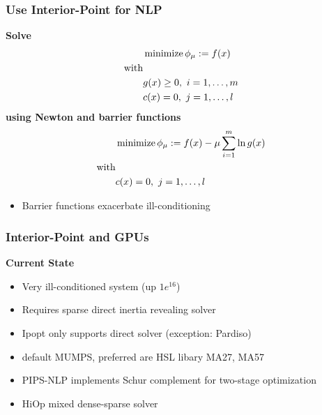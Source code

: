 \begin{frame}[fragile]
  \frametitle{Use Interior-Point for NLP}
  {\bf Solve}
  \begin{align*}
  &\minimize \phi_\mu := f(x)\\ 
  \text{with}&\\
  &g(x) \geq 0, \ i=1,\dots, m \\
  &c(x) = 0, \ j=1,\dots, l \\
  \end{align*}
  {\bf using Newton and barrier functions}
  \begin{align*}
  &\minimize \phi_\mu := f(x) - \mu \sum^m_{i=1} \ln g(x)\\ 
  \text{with}&\\
  &c(x) = 0, \ j=1,\dots, l 
  \end{align*}
  \begin{itemize}
    \item Barrier functions exacerbate ill-conditioning
  \end{itemize}
\end{frame}

\begin{frame}[fragile]
  \frametitle{Interior-Point and GPUs}
  {\bf Current State}
  \begin{itemize}
    \item Very ill-conditioned system (up $1e^{16}$)
    \item Requires sparse direct inertia revealing solver
    \item Ipopt only supports direct solver (exception: Pardiso)
    \item default MUMPS, preferred are HSL libary MA27, MA57 
    \item PIPS-NLP implements Schur complement for two-stage optimization
    \item HiOp mixed dense-sparse solver 
  \end{itemize}
\end{frame}


